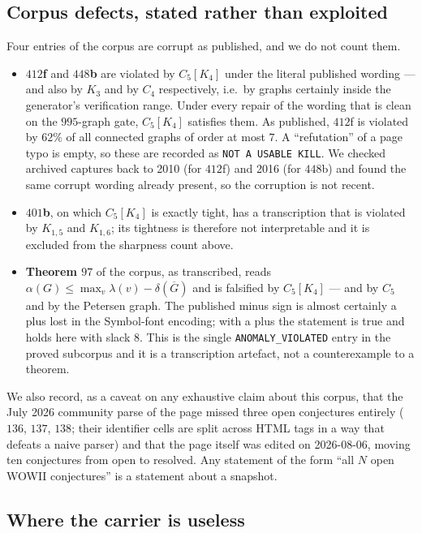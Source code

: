 \documentclass[10pt,a4paper]{article}
\theoremstyle{plain}
\theoremstyle{definition}
\newcommand{\ind}{\alpha}
\newcommand{\blow}[2]{#1[K_{#2}]}
\begin{document}
\subsection{Corpus defects, stated rather than exploited}\label{sec:corrupt}

Four entries of the corpus are corrupt as published, and we do not count them.

\begin{itemize}
\item \textbf{$412$f} and \textbf{$448$b} are violated by $\blow{C_5}{4}$ under the literal
published wording --- and also by $K_3$ and by $C_4$ respectively, i.e.\ by graphs certainly
inside the generator's verification range. Under every repair of the wording that is clean on
the $995$-graph gate, $\blow{C_5}{4}$ satisfies them. As published, $412$f is violated by $62\%$
of all connected graphs of order at most $7$. A ``refutation'' of a page typo is empty, so these
are recorded as \texttt{NOT A USABLE KILL}. We checked archived captures back to 2010 (for
$412$f) and 2016 (for $448$b) and found the same corrupt wording already present, so the
corruption is not recent.
\item \textbf{$401$b}, on which $\blow{C_5}{4}$ is exactly tight, has a transcription that is
violated by $K_{1,5}$ and $K_{1,6}$; its tightness is therefore not interpretable and it is
excluded from the sharpness count above.
\item \textbf{Theorem $97$} of the corpus, as transcribed, reads
$\ind(G) \le \max_v \lambda(v) - \delta(\overline{G})$ and is falsified by $\blow{C_5}{4}$ ---
and by $C_5$ and by the Petersen graph. The published minus sign is almost certainly a plus lost
in the Symbol-font encoding; with a plus the statement is true and holds here with slack $8$.
This is the single \texttt{ANOMALY\_VIOLATED} entry in the proved subcorpus and it is a
transcription artefact, not a counterexample to a theorem.
\end{itemize}

We also record, as a caveat on any exhaustive claim about this corpus, that the July 2026
community parse of the page missed three open conjectures entirely ($136$, $137$, $138$; their
identifier cells are split across HTML tags in a way that defeats a naive parser) and that the
page itself was edited on 2026-08-06, moving ten conjectures from open to resolved. Any
statement of the form ``all $N$ open WOWII conjectures'' is a statement about a snapshot.

\subsection{Where the carrier is useless}
\end{document}
